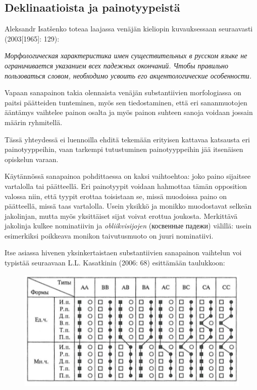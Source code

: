 \documentclass[]{scrartcl}
\begin{document}
\subsection{Deklinaatioista ja
painotyypeistä}\label{deklinaatioista-ja-painotyypeistuxe4}

Aleksandr Isatšenko toteaa laajassa venäjän kieliopin kuvauksessaan
seuraavasti (2003{[}1965{]}: 129):

\emph{Морфологическая характеристика имен существительных в русском
языке не ограничивается указанием всех падежных окончаний. Чтобы
правильно пользоваться словом, необходимо усвоить его акцентологические
особенности.}

Vapaan sanapainon takia olennaista venäjän substantiivien morfologiassa
on paitsi päätteiden tunteminen, myös sen tiedostaminen, että eri
sananmuotojen ääntämys vaihtelee painon osalta ja myös painon suhteen
sanoja voidaan jossain määrin ryhmitellä.

Tässä yhteydessä ei luennoilla ehditä tekemään erityisen kattavaa
katsausta eri painotyyppeihin, vaan tarkempi tutustuminen
painotyyppeihin jää itsenäisen opiskelun varaan.

Käytännössä sanapainoa pohdittaessa on kaksi vaihtoehtoa: joko paino
sijaitsee vartalolla tai päätteellä. Eri painotyypit voidaan hahmottaa
tämän opposition valossa niin, että tyypit erottaa toisistaan se, missä
muodoissa paino on päätteellä, missä taas vartalolla. Usein yksikkö ja
monikko muodostavat selkeän jakolinjan, mutta myös yksittäiset sijat
voivat erottua joukosta. Merkittävä jakolinja kulkee nominatiivin ja
\emph{obliikvisijojen} (косвенные падежи) välillä: usein esimerkiksi
poikkeava monikon taivutusmuoto on juuri nominatiivi.

Itse asiassa hivenen yksinkertaistaen substantiivien sanapainon
vaihtelun voi typistää seuraavaan L.L. Kasatkinin (2006: 68) esittämään
taulukkoon:

\begin{figure}[htbp]
\centering
\includegraphics{kasatkin.png}
\caption{}
\end{figure}
\end{document}
